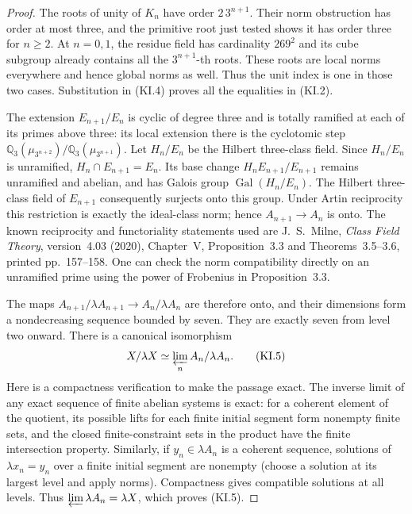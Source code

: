 \begin{proof}
The roots of unity of $K_n$ have order $2\,3^{n+1}$.
Their norm obstruction has order at most three, and the
primitive root just tested shows it has order three for
$n\geq2$.  At $n=0,1$, the residue field has cardinality
$269^2$ and its cube subgroup already contains all the
$3^{n+1}$-th roots.  These roots are local norms everywhere
and hence global norms as well.  Thus the unit index is
one in those two cases.  Substitution in (KI.4) proves
all the equalities in (KI.2).

The extension $E_{n+1}/E_n$ is cyclic of degree three and
is totally ramified at each of its primes above three: its
local extension there is the cyclotomic step
$\mathbb Q_3(\mu_{3^{n+2}})/\mathbb Q_3(\mu_{3^{n+1}})$.
Let $H_n/E_n$ be the Hilbert three-class field.  Since $H_n/E_n$
is unramified, $H_n\cap E_{n+1}=E_n$.
Its base change $H_nE_{n+1}/E_{n+1}$ remains unramified and
abelian, and has Galois group $\operatorname{Gal}(H_n/E_n)$.
The Hilbert three-class field of $E_{n+1}$ consequently
surjects onto this group.  Under Artin reciprocity this
restriction is exactly the ideal-class norm; hence
$A_{n+1}\to A_n$ is onto.  The known reciprocity and
functoriality statements used are J.~S.~Milne,
\emph{Class Field Theory}, version~4.03 (2020), Chapter~V,
Proposition~3.3 and Theorems~3.5--3.6, printed pp.~157--158.
One can check the norm compatibility directly on an unramified
prime using the power of Frobenius in Proposition~3.3.

The maps $A_{n+1}/\lambda A_{n+1}\to A_n/\lambda A_n$
are therefore onto, and their dimensions form a nondecreasing
sequence bounded by seven.  They are exactly seven from level two onward.
There is a canonical isomorphism
\[
 X/\lambda X\simeq\varprojlim_n A_n/\lambda A_n.       \tag{KI.5}
\]
Here is a compactness verification to make the passage exact.
The inverse limit of any exact sequence of finite abelian
systems is exact: for a coherent element of the quotient,
its possible lifts for each finite initial segment form
nonempty finite sets, and the closed finite-constraint sets
in the product have the finite intersection property.
Similarly, if $y_n\in\lambda A_n$ is a coherent sequence,
solutions of $\lambda x_n=y_n$ over a finite initial segment
are nonempty (choose a solution at its largest level and
apply norms).  Compactness gives compatible solutions at all
levels.  Thus $\varprojlim\lambda A_n=\lambda X$, which
proves (KI.5).


\end{proof}
